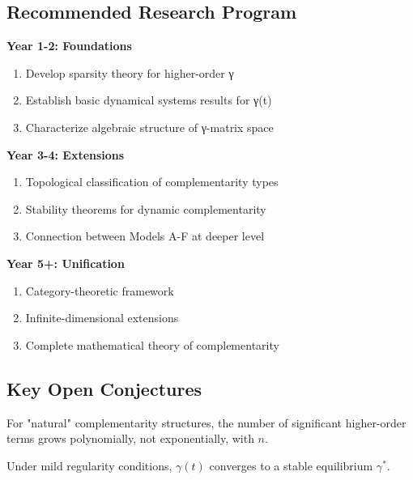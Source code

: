 \subsection{Recommended Research Program}

\begin{tcolorbox}[colback=green!5!white,colframe=green!75!black,title=\textbf{Proposed Mathematical Research Agenda}]

\textbf{Year 1-2: Foundations}
\begin{enumerate}[noitemsep]
    \item Develop sparsity theory for higher-order γ
    \item Establish basic dynamical systems results for γ(t)
    \item Characterize algebraic structure of γ-matrix space
\end{enumerate}

\textbf{Year 3-4: Extensions}
\begin{enumerate}[noitemsep]
    \item Topological classification of complementarity types
    \item Stability theorems for dynamic complementarity
    \item Connection between Models A-F at deeper level
\end{enumerate}

\textbf{Year 5+: Unification}
\begin{enumerate}[noitemsep]
    \item Category-theoretic framework
    \item Infinite-dimensional extensions
    \item Complete mathematical theory of complementarity
\end{enumerate}

\end{tcolorbox}

\subsection{Key Open Conjectures}

\begin{conjecture}
For "natural" complementarity structures, the number of significant higher-order terms grows polynomially, not exponentially, with $n$.
\end{conjecture}

\begin{conjecture}
Under mild regularity conditions, $\gamma(t)$ converges to a stable equilibrium $\gamma^*$.
\end{conjecture}

